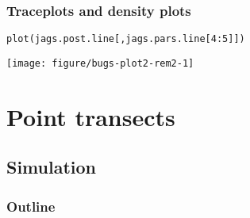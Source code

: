 \documentclass[color=usenames,dvipsnames]{beamer}\usepackage[]{graphicx}\usepackage[]{color}
\makeatletter
\newcommand{\hlnum}[1]{\textcolor[rgb]{0.69,0.494,0}{#1}}%
\newcommand{\hlopt}[1]{\textcolor[rgb]{0,0,0}{#1}}%
\newcommand{\hlstd}[1]{\textcolor[rgb]{0,0,0}{#1}}%
\newcommand{\hlkwd}[1]{\textcolor[rgb]{0.004,0.004,0.506}{#1}}%
\newenvironment{kframe}{%
 \def\at@end@of@kframe{}%
 \ifinner\ifhmode%
  \def\at@end@of@kframe{\end{minipage}}%
  \begin{minipage}{\columnwidth}%
 \fi\fi%
 \def\FrameCommand##1{\hskip\@totalleftmargin \hskip-\fboxsep
 \colorbox{shadecolor}{##1}\hskip-\fboxsep
     \hskip-\linewidth \hskip-\@totalleftmargin \hskip\columnwidth}%
 \MakeFramed {\advance\hsize-\width
   \@totalleftmargin\z@ \linewidth\hsize
   \@setminipage}}%
 {\par\unskip\endMakeFramed%
 \at@end@of@kframe}
\newenvironment{knitrout}{}{} %
\makeatother
\begin{document}
\begin{frame}[fragile]
  \frametitle{Traceplots and density plots}
\begin{knitrout}\footnotesize
{}\color{fgcolor}\begin{kframe}
\begin{alltt}
\hlkwd{plot}\hlstd{(jags.post.line[,jags.pars.line[}\hlnum{4}\hlopt{:}\hlnum{5}\hlstd{]])}
\end{alltt}
\end{kframe}

{\centering \texttt{[image: figure/bugs-plot2-rem2-1]} 

}



\end{knitrout}
\end{frame}




\section{Point transects}

\subsection{Simulation}


\begin{frame}
  \frametitle{Outline}
  \Large
\end{frame}
\end{document}

